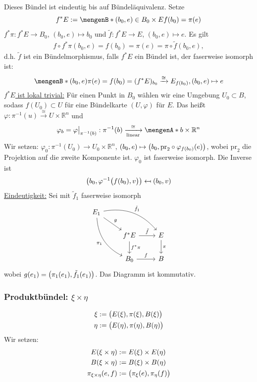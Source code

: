 Dieses Bündel ist eindeutig bis auf Bündeläquivalenz.
Setze
\[
	f^*E := \set[(b_0,e) \in B_0 \times E]{f(b_0) = \pi(e)} 
\]
$f^* \pi : f^*E \to B_0$, $(b_0,e) \mapsto b_0$ und $\tilde{f} : f^*E \to E$, $(b_0,e) \mapsto e$. Es gilt
\begin{align*}
	f \circ f^* \pi (b_0,e) = f(b_0) = \pi(e) = \pi \circ \tilde{f}(b_0,e),
\end{align*}
d.h. $\tilde{f}$ ist ein Bündelmorphismus, falls $f^*E$ ein Bündel ist, der faserweise isomorph ist: 
\[
	\set[(b_0,e)]{\pi(e)= f(b_0)} = (f^*E)_{b_0} \xrightarrow{\cong} E_{f(b_0)}, (b_0,e) \mapsto e 
\]
\uline{$f^*E$ ist lokal trivial:} Für einen Punkt in $B_0$ wählen wir eine Umgebung $U_0 \subset B$, sodass $f(U_0) \subset U$ für eine Bündelkarte $(U,\varphi)$ für $E$.
Das heißt $\varphi : \pi  ^{-1}(u) \xrightarrow{\cong} U \times \mathds{R}^n $ und
\[
	\varphi_b = \varphi\big|_{\pi ^{-1}(b)} : \pi  ^{-1}(b) \xrightarrow[\text{linear}]{\cong} \set{b} \times \mathds{R}^n 
\]
Wir setzen: $\varphi_0 : \pi  ^{-1} (U_0) \to U_0 \times \mathds{R}^n$, $(b_0,e) \mapsto \enbrace[\big]{b_0, \mathrm{pr}_2 \circ \varphi_{f(b_0)}(e)}$, wobei $\mathrm{pr}_2$ die Projektion auf die zweite Komponente ist. $\varphi_0$ ist faserweise isomorph. Die Inverse ist
\[
	\enbrace*{b_0, \varphi ^{-1} \enbrace[\big]{f(b_0), v} } \mapsfrom (b_0, v)
\]
\uline{Eindeutigkeit:} Sei mit $\tilde{f}_1$ faserweise isomorph
\[
	\begin{tikzcd}
		E_1 \drar{g} \arrow[ddr, swap, "\pi_1", bend right] \arrow[drr, "\tilde{f}_1", bend left]& & \\
		 & f^*E \rar{\tilde{f}} \dar{f^*\pi} & E \dar{\pi } \\
		& B_0 \rar{f} & B
	\end{tikzcd}
\]
wobei $g(e_1) = \enbrace*{\pi_1(e_1), \tilde{f}_1(e_1)} $. Das Diagramm ist kommutativ.

\subsubsection{Produktbündel: $\xi \times \eta$} %
\label{ssub:434}
\begin{align*}
	\xi & := \enbrace[\big]{E(\xi), \pi(\xi), B(\xi)} \\
	\eta & := \enbrace[\big]{E(\eta), \pi (\eta), B(\eta)}
\end{align*}
Wir setzen:
\begin{align*}
	E(\xi \times \eta) & := E(\xi) \times E(\eta) \\
	B(\xi \times \eta) & := B(\xi) \times B(\eta) \\
	\pi_{\xi \times \eta} (e,f) & := \enbrace[\big]{\pi_\xi(e), \pi_\eta(f)} 
\end{align*}

